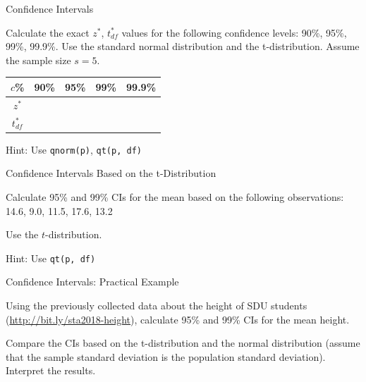 \begin{frame}{Confidence Intervals}
    \begin{example}
        \medskip
        Calculate the exact $z^*$, $t_{df}^*$ values for the following confidence levels: 90\%, 95\%, 99\%, 99.9\%. Use the standard normal distribution and the t-distribution. Assume the sample size $s = 5$.
    \end{example}

    \begin{tabular}{c | c c c c }
        $c$\%       & 90\% & 95\% & 99\% & 99.9\% \\
        \hline
        $z^*$       &      &      &      &         \\
        \hline
        $t^*_{df}$  &      &      &      &         \\
    \end{tabular}
    \bigskip

    {\tiny Hint: Use \texttt{qnorm(p)}, \texttt{qt(p, df)}}
\end{frame}

\begin{frame}{Confidence Intervals Based on the t-Distribution}
    \begin{example}
        \medskip
        Calculate 95\% and 99\% CIs for the mean based on the following observations:\\
        14.6, 9.0, 11.5, 17.6, 13.2
        
        Use the $t$-distribution.
    \end{example}
    \bigskip
    
    {\tiny Hint: Use \texttt{qt(p, df)}}
\end{frame}

\begin{frame}{Confidence Intervals: Practical Example}

    \begin{example}
        \medskip
        Using the previously collected data about the height of SDU students (\url{http://bit.ly/sta2018-height}), calculate 95\% and 99\% CIs for the mean height.
        
        Compare the CIs based on the t-distribution and the normal distribution (assume that the sample standard deviation is the population standard deviation). Interpret the results.
    \end{example}

\end{frame}

